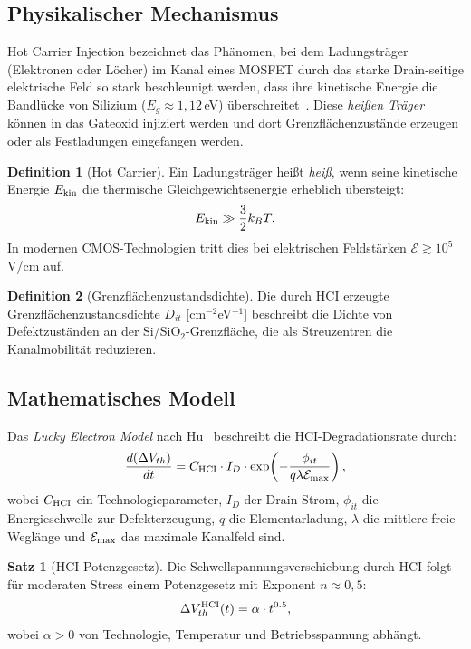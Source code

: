 ﻿\documentclass[a4paper,12pt]{article}
\theoremstyle{definition}
\newtheorem{definition}{Definition}
\newtheorem{satz}{Satz}
\begin{document}
\subsection{Physikalischer Mechanismus}

Hot Carrier Injection bezeichnet das Phänomen, bei dem Ladungsträger (Elektronen
oder Löcher) im Kanal eines MOSFET durch das starke Drain-seitige elektrische Feld
so stark beschleunigt werden, dass ihre kinetische Energie die Bandlücke von Silizium
($E_g \approx 1{,}12$\,eV) überschreitet~\cite{takeda1983,hu1985}. Diese
\emph{heißen Träger} können in das Gateoxid injiziert werden und dort
Grenzflächenzustände erzeugen oder als Festladungen eingefangen werden.

\begin{definition}[Hot Carrier]
	Ein Ladungsträger heißt \emph{heiß}, wenn seine kinetische Energie
	$E_{\rm kin}$ die thermische Gleichgewichtsenergie erheblich übersteigt:
	\[
	E_{\rm kin} \gg \frac{3}{2} k_B T.
	\]
	In modernen CMOS-Technologien tritt dies bei elektrischen Feldstärken
	$\mathcal{E} \gtrsim 10^5$\,V/cm auf.
\end{definition}

\begin{definition}[Grenzflächenzustandsdichte]
	Die durch HCI erzeugte Grenzflächenzustandsdichte $D_{it}$ [cm$^{-2}$eV$^{-1}$]
	beschreibt die Dichte von Defektzuständen an der Si/SiO$_2$-Grenzfläche,
	die als Streuzentren die Kanalmobilität reduzieren.
\end{definition}

\subsection{Mathematisches Modell}

Das \emph{Lucky Electron Model} nach Hu~\cite{hu1985} beschreibt die
HCI-Degradationsrate durch:
\[
\frac{d(\Delta V_{th})}{dt} = C_{\rm HCI} \cdot I_D \cdot
\exp\!\left(-\frac{\phi_{it}}{q\lambda \mathcal{E}_{\rm max}}\right),
\]
wobei $C_{\rm HCI}$ ein Technologieparameter, $I_D$ der Drain-Strom,
$\phi_{it}$ die Energieschwelle zur Defekterzeugung, $q$ die Elementarladung,
$\lambda$ die mittlere freie Weglänge und $\mathcal{E}_{\rm max}$ das maximale
Kanalfeld sind.

\begin{satz}[HCI-Potenzgesetz]
	\label{satz:hci}
	Die Schwellspannungsverschiebung durch HCI folgt für moderaten Stress einem
	Potenzgesetz mit Exponent $n \approx 0{,}5$:
	\[
	\Delta V_{th}^{\rm HCI}(t) = \alpha \cdot t^{0.5},
	\]
	wobei $\alpha > 0$ von Technologie, Temperatur und Betriebsspannung abhängt.
\end{satz}
\end{document}

